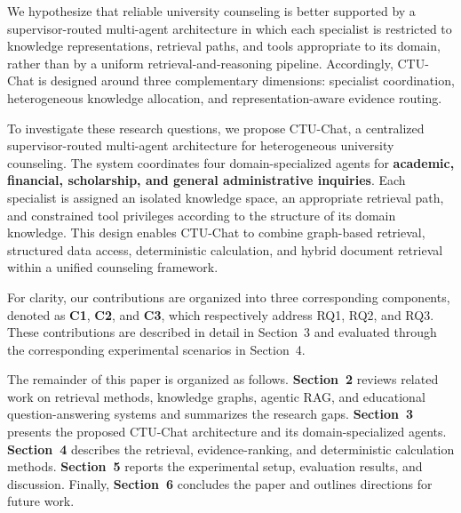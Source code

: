 We hypothesize that reliable university counseling is better supported by a supervisor-routed multi-agent architecture in which each specialist is restricted to knowledge representations, retrieval paths, and tools appropriate to its domain, rather than by a uniform retrieval-and-reasoning pipeline. Accordingly, CTU-Chat is designed around three complementary dimensions: specialist coordination, heterogeneous knowledge allocation, and representation-aware evidence routing.

To investigate these research questions, we propose CTU-Chat, a centralized supervisor-routed multi-agent architecture for heterogeneous university counseling. The system coordinates four domain-specialized agents for \textbf{academic, financial, scholarship, and general administrative inquiries}. Each specialist is assigned an isolated knowledge space, an appropriate retrieval path, and constrained tool privileges according to the structure of its domain knowledge. This design enables CTU-Chat to combine graph-based retrieval, structured data access, deterministic calculation, and hybrid document retrieval within a unified counseling framework.

For clarity, our contributions are organized into three corresponding components, denoted as \textbf{C1}, \textbf{C2}, and \textbf{C3}, which respectively address RQ1, RQ2, and RQ3. These contributions are described in detail in Section~3 and evaluated through the corresponding experimental scenarios in Section~4.

The remainder of this paper is organized as follows. \textbf{Section~2} reviews related work on retrieval methods, knowledge graphs, agentic RAG, and educational question-answering systems and summarizes the research gaps. \textbf{Section~3} presents the proposed CTU-Chat architecture and its domain-specialized agents. \textbf{Section~4} describes the retrieval, evidence-ranking, and deterministic calculation methods. \textbf{Section~5} reports the experimental setup, evaluation results, and discussion. Finally, \textbf{Section~6} concludes the paper and outlines directions for future work.
